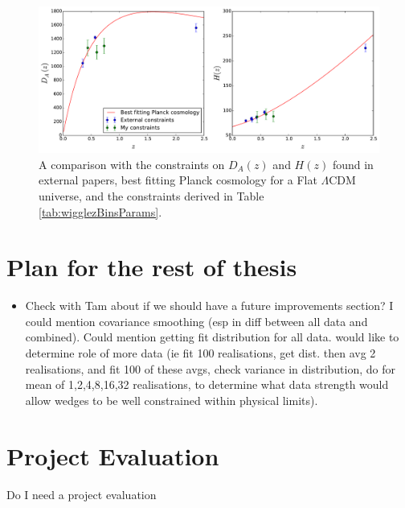 \documentclass[titlesmallcaps, examinerscopy, copyrightpage]{uqthesis}
\newcommand{\red}{\color{red}}
\begin{document}
\begin{figure}[h!]
  \begin{center}
    \includegraphics[width=\textwidth]{images/external.pdf}
  \end{center}
  \caption{A comparison with the constraints on $D_A(z)$ and $H(z)$ found in external papers, best fitting Planck cosmology for a Flat $\Lambda$CDM universe, and the constraints derived in Table \ref{tab:wigglezBinsParams}.}
  \label{fig:external}
\end{figure}







\chapter{Plan for the rest of thesis}
\begin{itemize}
\item Check with Tam about if we should have a future improvements section? I could mention covariance smoothing (esp in diff between all data and combined). Could mention getting fit distribution for all data. would like to determine role of more data (ie fit 100 realisations, get dist. then avg 2 realisations, and fit 100 of these avgs, check variance in distribution, do for mean of 1,2,4,8,16,32 realisations, to determine what data strength would allow wedges to be well constrained within physical limits).
\end{itemize}



\chapter{Project Evaluation}

{\red Do I need a project evaluation}
\end{document}
